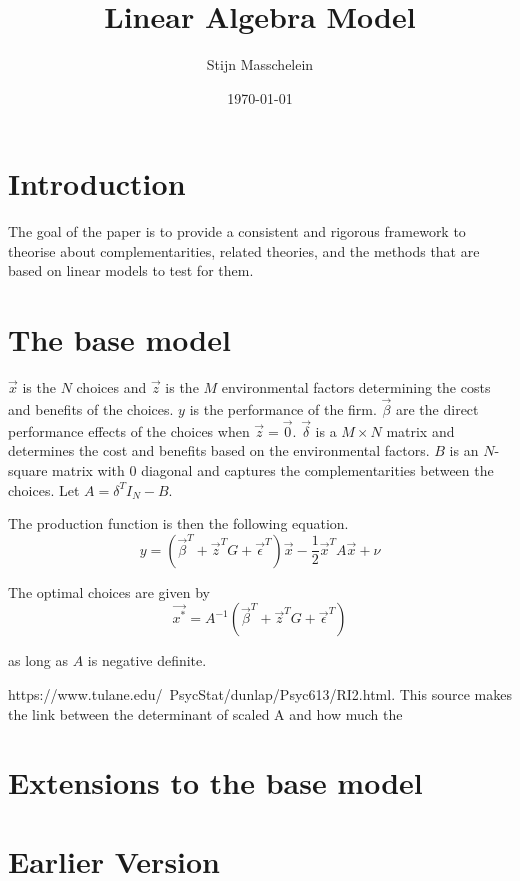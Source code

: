 \documentclass[]{article} %
\title{Linear Algebra Model}
\author{Stijn Masschelein}
\date{\today}
\begin{document}
\maketitle

\section{Introduction}
The goal of the paper is to provide a consistent and rigorous framework to theorise about complementarities, related theories, and the methods that are based on linear models to test for them. 

\section{The base model}

$\vec{x}$ is the $N$ choices and $\vec{z}$ is the $M$ environmental factors determining the costs and benefits of the choices. $y$ is the performance of the firm. $\vec{\beta}$ are the direct performance effects of the choices when $\vec{z} = \vec{0}$. $\vec{\delta}$ is a $M \times N$ matrix and determines the cost and benefits based on the environmental factors. $B$ is an $N$-square matrix with $0$ diagonal and captures the complementarities between the choices. Let $A = \delta^T I_N - B$. 

The production function is then the following equation.
\begin{equation}
\label{eq:production}
    y = (\vec{\beta}^T + \vec{z}^T G + \vec{\epsilon}^T) \vec{x} 
         - \frac{1}{2} \vec{x}^T A \vec{x} + \nu
\end{equation}

The optimal choices are given by 
\begin{equation}
\label{eq:optimal}
    \vec{x^*} = A^{-1}(\vec{\beta}^T + \vec{z}^T G + \vec{\epsilon}^T) 
\end{equation}

as long as $A$ is negative definite.

https://www.tulane.edu/~PsycStat/dunlap/Psyc613/RI2.html. This source makes the link between the determinant of scaled A and how much the 

\section{Extensions to the base model}

\section{Earlier Version}
\end{document}
